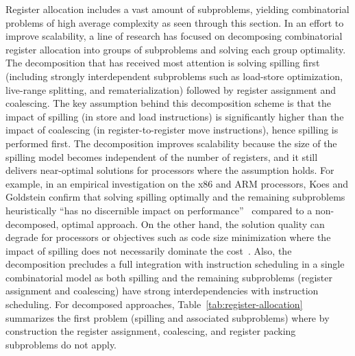 \documentclass[acmsmall,authorversion,nonacm]{acmart}
\begin{document}
Register allocation includes a vast amount of subproblems, yielding
combinatorial problems of high average complexity as seen through this
section.
In an effort to improve scalability, a line of research has focused on
decomposing combinatorial register allocation into groups of
subproblems and solving each group optimality.
The decomposition that has received most attention is solving spilling
first (including strongly interdependent subproblems such as
load-store optimization, live-range splitting, and rematerialization)
followed by register assignment and coalescing.
The key assumption behind this decomposition scheme is that the impact
of spilling (in store and load instructions) is significantly higher
than the impact of coalescing (in register-to-register move
instructions), hence spilling is performed first.
The decomposition improves scalability because the size of the
spilling model becomes independent of the number of registers, and it
still delivers near-optimal solutions for processors where the
assumption holds.
For example, in an empirical investigation on the x86 and ARM
processors, Koes and Goldstein confirm that solving spilling optimally
and the remaining subproblems heuristically ``has no discernible
impact on performance''~\cite{Koes2009} compared to a non-decomposed,
optimal approach.
On the other hand, the solution quality can degrade for processors or
objectives such as code size minimization where the impact of spilling
does not necessarily dominate the cost~\cite{Koes2009}.
Also, the decomposition precludes a full integration with instruction
scheduling in a single combinatorial model as both spilling and the
remaining subproblems (register assignment and coalescing) have strong
interdependencies with instruction scheduling.
For decomposed approaches, Table~\ref{tab:register-allocation}
summarizes the first problem (spilling and associated subproblems)
where by construction the register assignment, coalescing, and
register packing subproblems do not apply.
\end{document}
